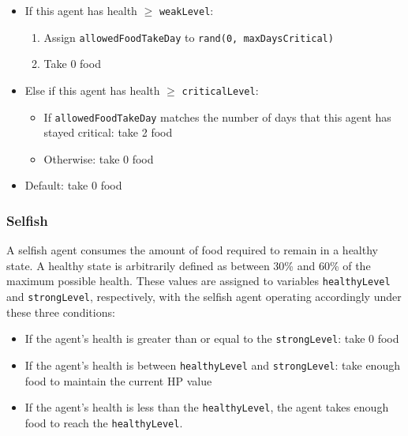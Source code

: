
\begin{itemize}
    \item If this agent has health $\geq$ \texttt{weakLevel}:
    \begin{enumerate}
        \item Assign \texttt{allowedFoodTakeDay} to \texttt{rand(0, maxDaysCritical)}
        \item Take 0 food
    \end{enumerate}
    \item Else if this agent has health $\geq$ \texttt{criticalLevel}:
    \begin{itemize}
        \item If \texttt{allowedFoodTakeDay} matches the number of days that this agent has stayed critical: take 2 food
        \item Otherwise: take 0 food
    \end{itemize}
    \item Default: take 0 food
\end{itemize}

\subsubsection{Selfish}

A selfish agent consumes the amount of food required to remain in a healthy state. A healthy state is arbitrarily defined as between 30\% and 60\% of the maximum possible health. These values are assigned to variables \texttt{healthyLevel} and \texttt{strongLevel}, respectively, with the selfish agent operating accordingly under these three conditions:

\begin{itemize}
    \item If the agent's health is greater than or equal to the \texttt{strongLevel}: take 0 food
    \item If the agent's health is between \texttt{healthyLevel} and \texttt{strongLevel}: take enough food to maintain the current HP value
    \item If the agent's health is less than the \texttt{healthyLevel}, the agent takes enough food to reach the \texttt{healthyLevel}.
\end{itemize}


